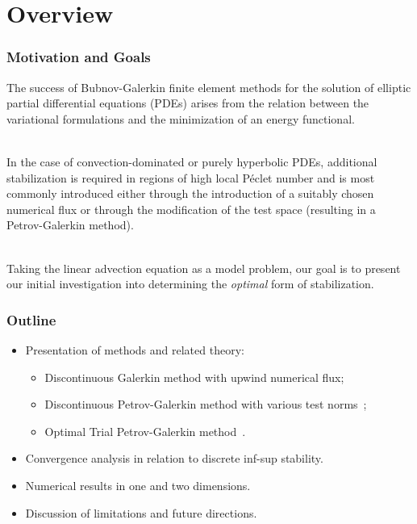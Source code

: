 \section{Overview}

\begin{frame}
\frametitle{Motivation and Goals}

The success of Bubnov-Galerkin finite element methods for the solution of elliptic partial differential equations (PDEs) arises from the relation between the variational formulations and the minimization of an energy functional. 
\\~

In the case of convection-dominated or purely hyperbolic PDEs, additional stabilization is required in regions of high local P\'eclet number and is most commonly introduced either through the introduction of a suitably chosen numerical flux or through the modification of the test space (resulting in a Petrov-Galerkin method).
\\~

Taking the linear advection equation as a model problem, our goal is to present our initial investigation into determining the \emph{optimal} form of stabilization. 

\end{frame}

\begin{frame}
\frametitle{Outline}

\begin{itemize}
\item Presentation of methods and related theory:
\begin{itemize}
\item Discontinuous Galerkin method with upwind numerical flux;
\item Discontinuous Petrov-Galerkin method with various test norms~\cite{Demkowicz2011};
\item Optimal Trial Petrov-Galerkin method~\cite{Brunken2018}.
\end{itemize}
\item Convergence analysis in relation to discrete inf-sup stability.
\item Numerical results in one and two dimensions.
\item Discussion of limitations and future directions.
\end{itemize}

\end{frame}
